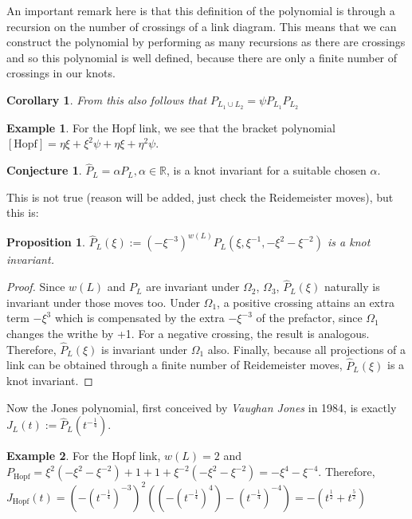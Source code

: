\documentclass[12pt]{article}
\newtheorem{prop}[thm]{Proposition}
\newtheorem{cor}[thm]{Corollary}
\theoremstyle{definition}
\newtheorem{conj}{Conjecture}[section]
\newtheorem{exmp}{Example}[section]
\begin{document}
\noindent An important remark here is that this definition of the polynomial is through a recursion on the number of crossings of a link diagram. This means that we can construct the polynomial by performing as many recursions as there are crossings and so this polynomial is well defined, because there are only a finite number of crossings in our knots. 

\begin{cor}\label{productofP}
From this also follows that $P_{L_1\cup L_2}=\psi P_{L_1} P_{L_2}$ 
\end{cor}

\begin{exmp}\label{brackethopf}
For the Hopf link, we see that the bracket polynomial $[\textrm{Hopf}]=\eta\xi+\xi^2\psi+\eta\xi+\eta^2\psi$.
\end{exmp}

\begin{conj}
$\hat{P}_L=\alpha P_L, \alpha \in \mathbb{R}$, is a knot invariant for a suitable chosen $\alpha$.
\end{conj}

This is not true (reason will be added, just check the Reidemeister moves), but this is:

\begin{prop}
$\hat{P}_L(\xi):=(-\xi^{-3})^{w(L)}P_L(\xi,\xi^{-1},-\xi^2-\xi^{-2})$ is a knot invariant.
\end{prop}

\begin{proof}
Since $w(L)$ and $P_L$ are invariant under $\Omega_2$, $\Omega_3$, $\hat{P}_L(\xi)$ naturally is invariant under those moves too. Under $\Omega_1$, a positive crossing attains an extra term $-\xi^3$ which is compensated by the extra $-\xi^{-3}$ of the prefactor, since $\Omega_1$ changes the writhe by +1. For a negative crossing, the result is analogous. Therefore, $\hat{P}_L(\xi)$ is invariant under $\Omega_1$ also. Finally, because all projections of a link can be obtained through a finite number of Reidemeister moves, $\hat{P}_L(\xi)$ is a knot invariant.
\end{proof}

\noindent Now the Jones polynomial, first conceived by \textit{Vaughan Jones} in 1984, is exactly $J_L(t):=\hat{P}_L(t^{-\frac{1}{4}})$. 

\begin{exmp}
For the Hopf link, $w(L)=2$ and $P_\textrm{Hopf}=\xi^2(-\xi^2-\xi^{-2})+1+1+\xi^{-2}(-\xi^2-\xi^{-2})=-\xi^4-\xi^{-4}$. Therefore, $J_{\textrm{Hopf}}(t)=(-(t^{-\frac{1}{4}})^{-3})^2 ((-(t^{-\frac{1}{4}})^4)-(t^{-\frac{1}{4}})^{-4})=-(t^{\frac{1}{2}}+t^{\frac{5}{2}})$
\end{exmp}
\end{document}
